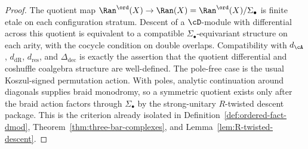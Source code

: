 \begin{proof}
The quotient map
$\Ran^{\ord}(X)\to\Ran(X)=\Ran^{\ord}(X)/\Sigma_\bullet$ is finite
etale on each configuration stratum. Descent of a $\cD$-module with
differential across this quotient is equivalent to a compatible
$\Sigma_\bullet$-equivariant structure on each arity, with the cocycle
condition on double overlaps. Compatibility with $d_\cA$,
$d_{\mathrm{dR}}$, $d_{\mathrm{res}}$, and $\Delta_{\mathrm{dec}}$ is exactly the assertion
that the quotient differential and coshuffle coalgebra structure are
well-defined. The pole-free case is the usual Koszul-signed
permutation action. With poles, analytic continuation around
diagonals supplies braid monodromy, so a symmetric quotient exists only
after the braid action factors through $\Sigma_\bullet$ by the
strong-unitary $R$-twisted descent package. This is the criterion
already isolated in Definition~\ref{def:ordered-fact-dmod},
Theorem~\ref{thm:three-bar-complexes}, and
Lemma~\ref{lem:R-twisted-descent}.
\end{proof}


